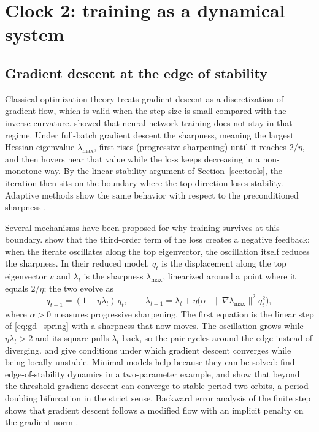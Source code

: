 \section{Clock 2: training as a dynamical system}
\label{sec:clock2}

\subsection{Gradient descent at the edge of stability}
\label{sec:eos}

Classical optimization theory treats gradient descent as a discretization of gradient flow, which is valid when the step size is small compared with the inverse curvature. \citet{cohen2021gradient} showed that neural network training does not stay in that regime. Under full-batch gradient descent the sharpness, meaning the largest Hessian eigenvalue $\lambda_{\max}$, first rises (progressive sharpening) until it reaches $2/\eta$, and then hovers near that value while the loss keeps decreasing in a non-monotone way. By the linear stability argument of Section~\ref{sec:tools}, the iteration then sits on the boundary where the top direction loses stability. Adaptive methods show the same behavior with respect to the preconditioned sharpness \citep{cohen2022adaptive}.

Several mechanisms have been proposed for why training survives at this boundary. \citet{damian2022selfstabilization} show that the third-order term of the loss creates a negative feedback: when the iterate oscillates along the top eigenvector, the oscillation itself reduces the sharpness. In their reduced model, $q_t$ is the displacement along the top eigenvector $v$ and $\lambda_t$ is the sharpness $\lambda_{\max}$, linearized around a point where it equals $2/\eta$; the two evolve as
\begin{equation}
q_{t+1}=(1-\eta\lambda_t)\,q_t,\qquad \lambda_{t+1}=\lambda_t+\eta\big(\alpha-\|\nabla\lambda_{\max}\|^2 q_t^2\big),
\label{eq:selfstab}
\end{equation}
where $\alpha>0$ measures progressive sharpening. The first equation is the linear step of \eqref{eq:gd_spring} with a sharpness that now moves. The oscillation grows while $\eta\lambda_t>2$ and its square pulls $\lambda_t$ back, so the pair cycles around the edge instead of diverging. \citet{arora2022gradient} and \citet{ahn2022unstable} give conditions under which gradient descent converges while being locally unstable. Minimal models help because they can be solved: \citet{zhu2022edgeofstability} find edge-of-stability dynamics in a two-parameter example, and \citet{chen2022edge} show that beyond the threshold gradient descent can converge to stable period-two orbits, a period-doubling bifurcation in the strict sense. Backward error analysis of the finite step shows that gradient descent follows a modified flow with an implicit penalty on the gradient norm \citep{barrett2020implicit}.

